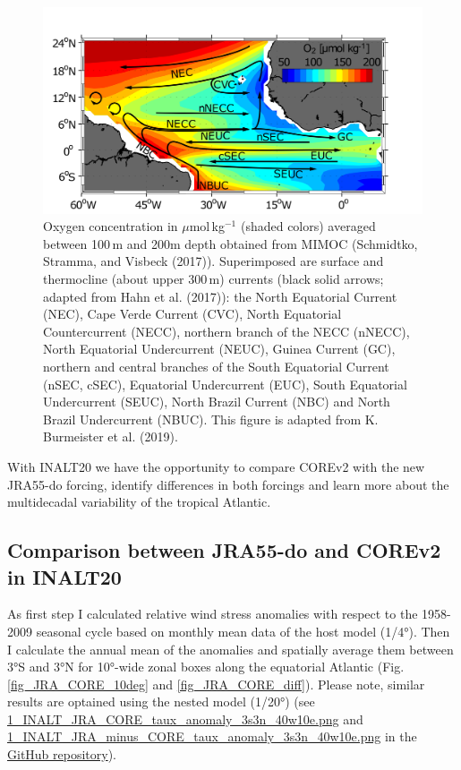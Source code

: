 \documentclass[a4paperpaper,]{article}
\begin{document}
\begin{figure}
\centering
\includegraphics{./figures/from_thesis/f02_schema_MIMOC_100m200m.png}
\caption{Oxygen concentration in \(\mu\)mol\(\,\)kg\(^{-1}\) (shaded
colors) averaged between 100\(\,\)m and 200m depth obtained from MIMOC
(Schmidtko, Stramma, and Visbeck (2017)). Superimposed are surface and
thermocline (about upper 300\(\,\)m) currents (black solid arrows;
adapted from Hahn et al. (2017)): the North Equatorial Current (NEC),
Cape Verde Current (CVC), North Equatorial Countercurrent (NECC),
northern branch of the NECC (nNECC), North Equatorial Undercurrent
(NEUC), Guinea Current (GC), northern and central branches of the South
Equatorial Current (nSEC, cSEC), Equatorial Undercurrent (EUC), South
Equatorial Undercurrent (SEUC), North Brazil Current (NBC) and North
Brazil Undercurrent (NBUC). This figure is adapted from K. Burmeister et
al. (2019).\label{fig_schema}}
\end{figure}

With INALT20 we have the opportunity to compare COREv2 with the new
JRA55-do forcing, identify differences in both forcings and learn more
about the multidecadal variability of the tropical Atlantic.

\subsection{Comparison between JRA55-do and COREv2 in
INALT20}\label{comparison-between-jra55-do-and-corev2-in-inalt20}

As first step I calculated relative wind stress anomalies with respect
to the 1958-2009 seasonal cycle based on monthly mean data of the host
model (1/4°). Then I calculate the annual mean of the anomalies and
spatially average them between 3°S and 3°N for 10°-wide zonal boxes
along the equatorial Atlantic (Fig. \ref{fig_JRA_CORE_10deg} and
\ref{fig_JRA_CORE_diff}). Please note, similar results are optained
using the nested model (1/20°) (see
\href{./figures/1_INALT_JRA_CORE_taux_anomaly_3s3n_40w10e.png}{1\_INALT\_JRA\_CORE\_taux\_anomaly\_3s3n\_40w10e.png}
and
\href{./figures/INALT20_wind_forcing_comparison/1_INALT_JRA_minus_CORE_taux_anomaly_3s3n_40w10e.png}{1\_INALT\_JRA\_minus\_CORE\_taux\_anomaly\_3s3n\_40w10e.png}
in the \href{https://github.com/Kristin-2002/Wind_forcing.git}{GitHub
repository}).
\end{document}
